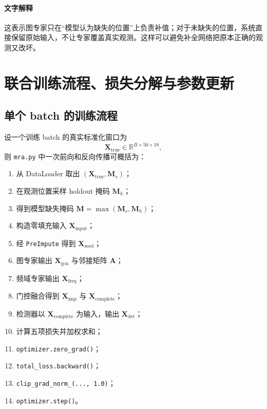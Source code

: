 \documentclass[UTF8]{ctexart}
\begin{document}
\paragraph{文字解释}
这表示图专家只在“模型认为缺失的位置”上负责补值；对于未缺失的位置，系统直接保留原始输入，不让专家覆盖真实观测。这样可以避免补全网络把原本正确的观测又改坏。

\section{联合训练流程、损失分解与参数更新}

\subsection{单个 batch 的训练流程}

设一个训练 batch 的真实标准化窗口为
\begin{equation}
    \bm{X}_{\text{true}} \in \mathbb{R}^{B \times 50 \times 18},
\end{equation}
则 \verb|mra.py| 中一次前向和反向传播可概括为：
\begin{enumerate}
    \item 从 DataLoader 取出 \((\bm{X}_{\text{true}}, \bm{M}_s)\)；
    \item 在观测位置采样 holdout 掩码 \(\bm{M}_h\)；
    \item 得到模型缺失掩码 \(\bm{M}=\max(\bm{M}_s,\bm{M}_h)\)；
    \item 构造零填充输入 \(\bm{X}_{\text{input}}\)；
    \item 经 \verb|PreImpute| 得到 \(\bm{X}_{\text{seed}}\)；
    \item 图专家输出 \(\bm{X}_{\text{gcn}}\) 与邻接矩阵 \(\bm{A}\)；
    \item 频域专家输出 \(\bm{X}_{\text{freq}}\)；
    \item 门控融合得到 \(\bm{X}_{\text{imp}}\) 与 \(\bm{X}_{\text{complete}}\)；
    \item 检测器以 \(\bm{X}_{\text{complete}}\) 为输入，输出 \(\bm{X}_{\text{det}}\)；
    \item 计算五项损失并加权求和；
    \item \verb|optimizer.zero_grad()|；
    \item \verb|total_loss.backward()|；
    \item \verb|clip_grad_norm_(..., 1.0)|；
    \item \verb|optimizer.step()|。
\end{enumerate}
\end{document}
